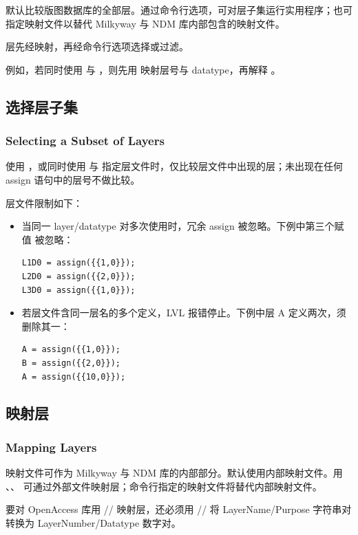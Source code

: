 默认比较版图数据库的全部层。通过命令行选项，可对层子集运行实用程序；也可指定映射文件以替代 Milkyway 与 NDM 库内部包含的映射文件。

层先经映射，再经命令行选项选择或过滤。

例如，若同时使用  与 ，则先用  映射层号与 datatype，再解释 。

\subsection{选择层子集}
\subsubsection*{Selecting a Subset of Layers}

使用 ，或同时使用  与  指定层文件时，仅比较层文件中出现的层；未出现在任何 assign 语句中的层号不做比较。

层文件限制如下：
\begin{itemize}
  \item 当同一 layer/datatype 对多次使用时，冗余 assign 被忽略。下例中第三个赋值  被忽略：
\begin{lstlisting}[style=pxl]
L1D0 = assign({{1,0}});
L2D0 = assign({{2,0}});
L3D0 = assign({{1,0}});
\end{lstlisting}
  \item 若层文件含同一层名的多个定义，LVL 报错停止。下例中层 A 定义两次，须删除其一：
\begin{lstlisting}[style=pxl]
A = assign({{1,0}});
B = assign({{2,0}});
A = assign({{10,0}});
\end{lstlisting}
\end{itemize}

\subsection{映射层}
\subsubsection*{Mapping Layers}

映射文件可作为 Milkyway 与 NDM 库的内部部分。默认使用内部映射文件。用 、、 可通过外部文件映射层；命令行指定的映射文件将替代内部映射文件。

\begin{noteBox}
要对 OpenAccess 库用 // 映射层，还必须用 // 将 LayerName/Purpose 字符串对转换为 LayerNumber/Datatype 数字对。
\end{noteBox}

